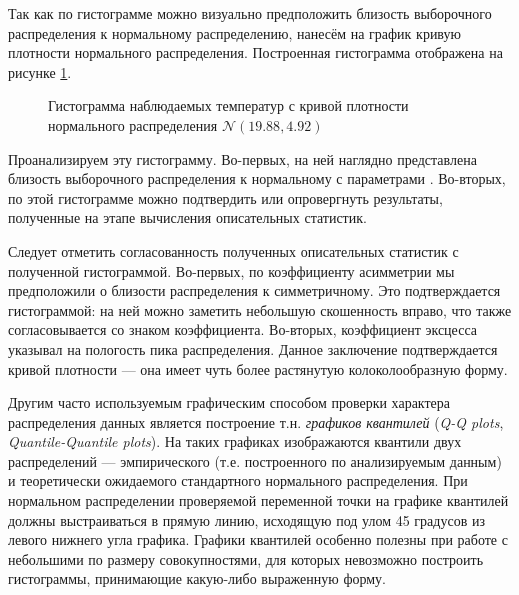 Так как по гистограмме можно визуально предположить близость выборочного распределения к нормальному распределению, нанесём на график кривую плотности нормального распределения. Построенная гистограмма отображена на рисунке \ref{img:histogram_fitted}.
\begin{figure}[ht]
\caption{Гистограмма наблюдаемых температур с кривой плотности нормального распределения $\mathcal{N}(19.88, 4.92)$}
\label{img:histogram_fitted}
\end{figure}
Проанализируем эту гистограмму. Во-первых, на ней наглядно представлена близость выборочного распределения к нормальному с параметрами \normaldistr. Во-вторых, по этой гистограмме можно подтвердить или опровергнуть результаты, полученные на этапе вычисления описательных статистик.

Следует отметить согласованность полученных описательных статистик с полученной гистограммой. Во-первых, по коэффициенту асимметрии мы предположили о близости распределения к симметричному. Это подтверждается гистограммой: на ней можно заметить небольшую скошенность вправо, что также согласовывается со знаком коэффициента. Во-вторых, коэффициент эксцесса указывал на пологость пика распределения. Данное заключение подтверждается кривой плотности --- она имеет чуть более растянутую колоколообразную форму.

Другим часто используемым графическим способом проверки характера распределения данных является построение т.н. \textit{графиков квантилей} (\textit{Q-Q plots}, \textit{Quantile-Quantile plots}). На таких графиках изображаются квантили двух распределений --- эмпирического (т.е. построенного по анализируемым данным) и теоретически ожидаемого стандартного нормального распределения. При нормальном распределении проверяемой переменной точки на графике квантилей должны выстраиваться в прямую линию, исходящую под улом 45 градусов из левого нижнего угла графика. Графики квантилей особенно полезны при работе с небольшими по размеру совокупностями, для которых невозможно построить гистограммы, принимающие какую-либо выраженную форму.

